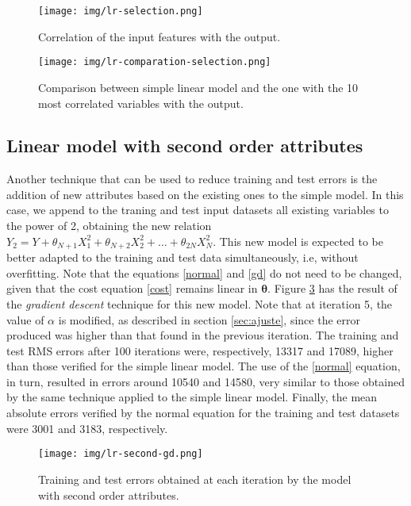 \documentclass[10pt,twocolumn,letterpaper]{article}
\begin{document}
\begin{figure}
    \centering
    \texttt{[image: img/lr-selection.png]}
    \caption{Correlation of the input features with the output.}
    \label{fig:correlation}
\end{figure}

\begin{figure}
    \centering
    \texttt{[image: img/lr-comparation-selection.png]}
    \caption{Comparison between simple linear model and the one with the 10 most correlated variables with the output.}
    \label{fig:comparison-selection}
\end{figure}

\subsection{Linear model with second order attributes}

Another technique that can be used to reduce training and test errors is the addition of new attributes based on the existing ones to the simple model. In this case, we append to the traning and test input datasets all existing variables to the power of 2, obtaining the new relation \(Y_2 = Y + \theta_{N + 1}X_1 ^ 2 + \theta_{N + 2}X_2 ^ 2 + \ldots + \theta_{2N}X_N^2\). This new model is expected to be better adapted to the training and test data simultaneously, i.e, without overfitting. Note that the equations \ref{normal} and \ref{gd} do not need to be changed, given that the cost equation \ref {cost} remains linear in \(\bm{\theta}\). Figure \ref{fig:gd-second} has the result of the \textit {gradient descent} technique for this new model. Note that at iteration 5, the value of \(\alpha\) is modified, as described in section \ref{sec:ajuste}, since the error produced was higher than that found in the previous iteration. The training and test RMS errors after 100 iterations were, respectively, 13317 and 17089, higher than those verified for the simple linear model. The use of the \ref{normal} equation, in turn, resulted in errors around 10540 and 14580, very similar to those obtained by the same technique applied to the simple linear model. Finally, the mean absolute errors verified by the normal equation for the training and test datasets were 3001 and 3183, respectively.

\begin{figure}
    \centering
    \texttt{[image: img/lr-second-gd.png]}
    \caption{Training and test errors obtained at each iteration by the model with second order attributes.}
    \label{fig:gd-second}
\end{figure}
\end{document}
